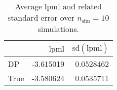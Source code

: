\begin{table}[H]

\caption{Average lpml and related standard error over $n_{\text{sim}} = 10$ simulations.}
\centering
\begin{tabular}[t]{lrr}
\toprule
  & $\overbar{\text{lpml}}$ & $\text{sd}(\overbar{\text{lpml}})$\\
\midrule
DP & -3.615019 & 0.0528462\\
True & -3.580624 & 0.0535711\\
\bottomrule
\end{tabular}
\end{table}